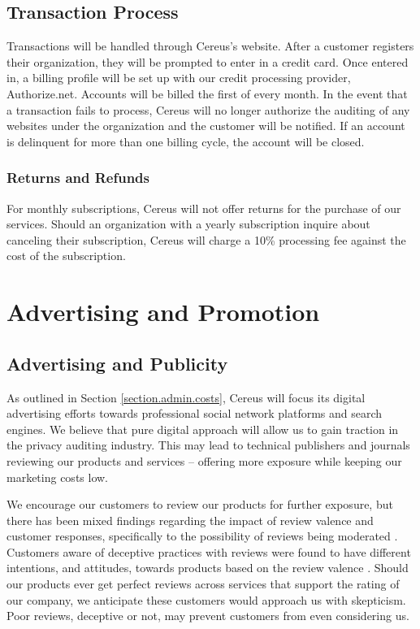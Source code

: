 \subsection{Transaction Process} \label{transaction.process}

Transactions will be handled through Cereus's website. After a customer registers their organization, they will be prompted to enter in a credit card. Once entered in, a billing profile will be set up with our credit processing provider, Authorize.net. Accounts will be billed the first of every month. In the event that a transaction fails to process, Cereus will no longer authorize the auditing of any websites under the organization and the customer will be notified. If an account is delinquent for more than one billing cycle, the account will be closed.

\subsubsection{Returns and Refunds}

For monthly subscriptions, Cereus will not offer returns for the purchase of our services. Should an organization with a yearly subscription inquire about canceling their subscription, Cereus will charge a 10\% processing fee against the cost of the subscription.



\section{Advertising and Promotion}

\subsection{Advertising and Publicity}

As outlined in Section \ref{section.admin.costs}, Cereus will focus its digital advertising efforts towards professional social network platforms and search engines. We believe that pure digital approach will allow us to gain traction in the privacy auditing industry. This may lead to technical publishers and journals reviewing our products and services -- offering more exposure while keeping our marketing costs low.

We encourage our customers to review our products for further exposure, but there has been mixed findings regarding the impact of review valence and customer responses, specifically to the possibility of reviews being moderated \cite{maslowska.reviews.2017}. Customers aware of deceptive practices with reviews were found to have different intentions, and attitudes, towards products based on the review valence \cite{karabas.reviews.2020}. Should our products ever get perfect reviews across services that support the rating of our company, we anticipate these customers would approach us with skepticism. Poor reviews, deceptive or not, may prevent customers from even considering us.

